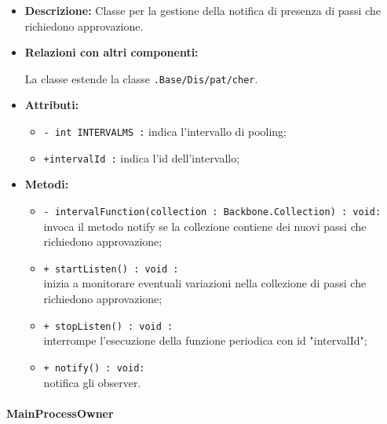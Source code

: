 \begin{flushleft}
\begin{itemize}
\item \textbf{Descrizione:} Classe per la gestione della notifica di presenza di passi che richiedono approvazione.
\item \textbf{Relazioni con altri componenti:}
\begin{sloppypar}
La classe estende la classe \texttt{\logic{}.Base\fshyp{}Dis\fshyp{}pat\fshyp{}cher}.
\end{sloppypar}
\item \textbf{Attributi:}
\begin{sloppypar}
\begin{itemize}
	\item \texttt{- int INTERVALMS :} indica l'intervallo di pooling;
  	\item \texttt{+intervalId :} indica l'id dell'intervallo;
\end{itemize}
\end{sloppypar}
\item \textbf{Metodi:}
\begin{sloppypar}
\begin{itemize}  
	\item \texttt{- intervalFunction(collection : Backbone.Collection) : void:}\\ invoca il metodo notify se la collezione contiene dei nuovi passi che richiedono approvazione;
  	\item \texttt{+ startListen() : void :}\\ inizia a monitorare eventuali variazioni nella collezione di passi che richiedono approvazione;
  	\item \texttt{+ stopListen() : void :}\\ interrompe l'esecuzione della funzione periodica con id "intervalId";
  	\item \texttt{+ notify() : void:}\\ notifica gli observer.
\end{itemize}
\end{sloppypar}
\end{itemize}
\end{flushleft}

\paragraph{MainProcessOwner}
\label{mainProcessOwner}

